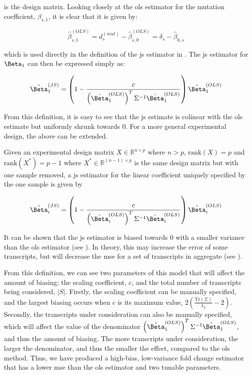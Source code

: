 is the design matrix.
Looking closely at the \gls{ols} estimator for the mutation coefficient, $\beta_{s,1}$, it is clear that it is given by:

\begin{equation}
  \hat{\beta}_{s,1}^{(OLS)} = d_s^{(mut)} - \hat{\beta}_{s,0}^{(OLS)} = \delta_s - \hat{\beta}_{0,s}
\end{equation}

which is used directly in the definition of the \gls{js} estimator in .
The \gls{js} estimator for $\Beta_1$ can then be expressed simply as:

\begin{equation}
  \hat{\Beta}_1^{(JS)} = \left( 1 - \frac{c}{\left( \hat{\Beta}_1^{(OLS)} \right)^T \Sigma^{-1} \hat{\Beta}_1^{(OLS)}} \right) \hat{\Beta}_1^{(OLS)}
  \label{eqn:js_defn_ols}
\end{equation}

From this definition, it is easy to see that the \gls{js} estimate is colinear with the \gls{ols} estimate but uniformly shrunk towards 0.
For a more general experimental design, the above can be extended.

\begin{theorem}
  Given an experimental design matrix $X \in \mathbb{R}^{n \times p}$ where $n > p$, $\text{rank}(X) = p$ and $\text{rank}(X^*) = p - 1$ where $X^* \in \mathbb{R}^{(n - 1) \times p}$ is the same design matrix but with one sample removed, a \gls{js} estimator for the linear coefficient uniquely specified by the one sample is given by

  \begin{equation*}
    \hat{\Beta}_i^{(JS)} = \left( 1 - \frac{c}{\left( \hat{\Beta}_i^{(OLS)} \right)^T \Sigma^{-1} \hat{\Beta}_i^{(OLS)}} \right) \hat{\Beta}_i^{(OLS)}
  \end{equation*}
\end{theorem}

It can be shown that the \gls{js} estimator is biased towards 0 with a smaller variance than the \gls{ols} estimator (see ).
In theory, this may increase the error of some transcripts, but will decrease the \gls{mse} for a set of transcripts in aggregate (see ).

From this definition, we can see two parameters of this model that will affect the amount of biasing: the scaling coefficient, $c$, and the total number of transcripts being considered, $|S|$.
Firstly, the scaling coefficient can be manually specified, and the largest biasing occurs when $c$ is its maximum value, $2 \left( \frac{\text{Tr}(\Sigma)}{\lambda_L} - 2 \right)$.
Secondly, the transcripts under consideration can also be manually specified, which will affect the value of the denominator $\left( \hat{\Beta}_1^{(OLS)} \right)^T \Sigma^{-1} \hat{\Beta}_1^{(OLS)}$, and thus the amount of biasing.
The more transcripts under consideration, the larger the denominator, and thus the smaller the effect, compared to the \gls{ols} method.
Thus, we have produced a high-bias, low-variance fold change estimator that has a lower \gls{mse} than the \gls{ols} estimator and two tunable parameters.

